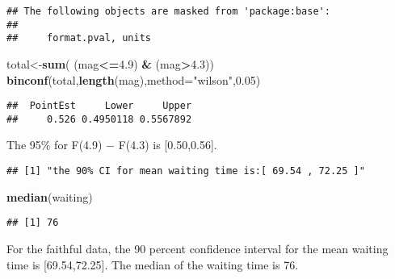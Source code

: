 \documentclass[]{article}
\newenvironment{Shaded}{\begin{snugshade}}{\end{snugshade}}
\newcommand{\KeywordTok}[1]{\textcolor[rgb]{0.13,0.29,0.53}{\textbf{#1}}}
\newcommand{\DataTypeTok}[1]{\textcolor[rgb]{0.13,0.29,0.53}{#1}}
\newcommand{\DecValTok}[1]{\textcolor[rgb]{0.00,0.00,0.81}{#1}}
\newcommand{\FloatTok}[1]{\textcolor[rgb]{0.00,0.00,0.81}{#1}}
\newcommand{\StringTok}[1]{\textcolor[rgb]{0.31,0.60,0.02}{#1}}
\newcommand{\OperatorTok}[1]{\textcolor[rgb]{0.81,0.36,0.00}{\textbf{#1}}}
\newcommand{\NormalTok}[1]{#1}
\begin{document}
\begin{verbatim}
## The following objects are masked from 'package:base':
## 
##     format.pval, units
\end{verbatim}

\begin{Shaded}
\begin{Highlighting}[]
\NormalTok{total<-}\KeywordTok{sum}\NormalTok{( (mag}\OperatorTok{<=}\FloatTok{4.9}\NormalTok{) }\OperatorTok{&}\StringTok{ }\NormalTok{(mag}\OperatorTok{>}\FloatTok{4.3}\NormalTok{))}
\KeywordTok{binconf}\NormalTok{(total,}\KeywordTok{length}\NormalTok{(mag),}\DataTypeTok{method=}\StringTok{"wilson"}\NormalTok{,}\FloatTok{0.05}\NormalTok{)}
\end{Highlighting}
\end{Shaded}

\begin{verbatim}
##  PointEst     Lower     Upper
##     0.526 0.4950118 0.5567892
\end{verbatim}

The 95\% for F(4.9) − F(4.3) is {[}0.50,0.56{]}.

\begin{Shaded}
\end{Shaded}

\begin{verbatim}
## [1] "the 90% CI for mean waiting time is:[ 69.54 , 72.25 ]"
\end{verbatim}

\begin{Shaded}
\begin{Highlighting}[]
\KeywordTok{median}\NormalTok{(waiting)}
\end{Highlighting}
\end{Shaded}

\begin{verbatim}
## [1] 76
\end{verbatim}

For the faithful data, the 90 percent confidence interval for the mean
waiting time is {[}69.54,72.25{]}. The median of the waiting time is 76.
\end{document}
